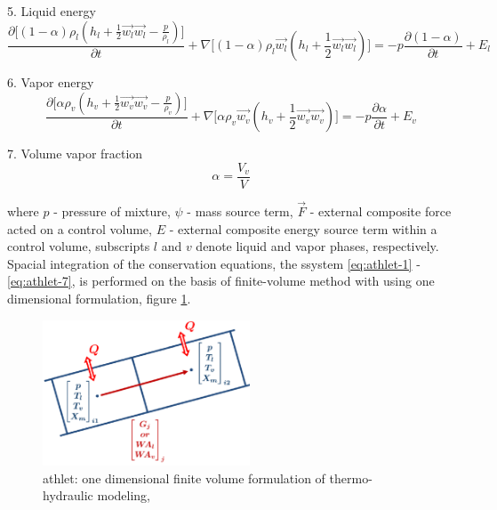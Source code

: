 5. Liquid energy
\begin{equation} \label{eq:athlet-5}
\frac{\partial \Big[ (1-\alpha)\rho_{l}(h_{l} + \frac{1}{2} \vec{w_{l}} \vec{w_{l}} - \frac{p}{\rho_{l}}) \Big]}{\partial t} + \nabla \Big[ (1-\alpha)\rho_{l}\vec{w_{l}}(h_{l} + \frac{1}{2} \vec{w_{l}} \vec{w_{l}}) \Big] = - p \frac{\partial (1 - \alpha)}{\partial t} + E_{l}
\end{equation}


6. Vapor energy
\begin{equation} \label{eq:athlet-6}
\frac{\partial \Big[ \alpha \rho_{v}(h_{v} + \frac{1}{2} \vec{w_{v}} \vec{w_{v}} - \frac{p}{\rho_{v}}) \Big]}{\partial t} + \nabla \Big[ \alpha\rho_{v}\vec{w_{v}}(h_{v} + \frac{1}{2} \vec{w_{v}} \vec{w_{v}}) \Big] = - p \frac{\partial \alpha}{\partial t} + E_{v}
\end{equation}

7. Volume vapor fraction
\begin{equation} \label{eq:athlet-7}
	\alpha = \frac{V_{v}}{V}
\end{equation}


where $p$ - pressure of mixture, $\psi$ - mass source term, $\vec{F}$ - external composite force acted on a control volume, $E$ - external composite energy source term within a control volume, subscripts $l$ and $v$ denote liquid and vapor phases, respectively. \\


Spacial integration of the conservation equations, the ssystem \ref{eq:athlet-1} - \ref{eq:athlet-7}, is performed on the basis of finite-volume method with using one dimensional formulation, figure \ref{fig:introduction-1d-fvm}.


\figpointer{\ref{fig:introduction-1d-fvm}}
\begin{figure}[htpb]
  \centering
  \includegraphics[width=0.55\textwidth]{figures/introduction-1d-fvm.png}
\caption{\gls{athlet}: one dimensional finite volume formulation of thermo-hydraulic modeling, \cite{tims-presentation}}
\label{fig:introduction-1d-fvm}
\end{figure}


